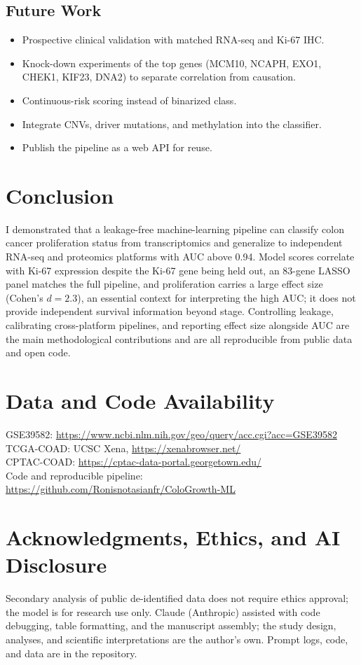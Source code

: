 \documentclass[12pt]{article}
\begin{document}
\subsection{Future Work}
\begin{itemize}
\item Prospective clinical validation with matched RNA-seq and Ki-67 IHC.
\item Knock-down experiments of the top genes (MCM10, NCAPH, EXO1, CHEK1, KIF23, DNA2) to separate correlation from causation.
\item Continuous-risk scoring instead of binarized class.
\item Integrate CNVs, driver mutations, and methylation into the classifier.
\item Publish the pipeline as a web API for reuse.
\end{itemize}

\section{Conclusion}

I demonstrated that a leakage-free machine-learning pipeline can classify colon cancer proliferation status from transcriptomics and generalize to independent RNA-seq and proteomics platforms with AUC above 0.94. Model scores correlate with Ki-67 expression despite the Ki-67 gene being held out, an 83-gene LASSO panel matches the full pipeline, and proliferation carries a large effect size (Cohen's $d = 2.3$), an essential context for interpreting the high AUC; it does not provide independent survival information beyond stage. Controlling leakage, calibrating cross-platform pipelines, and reporting effect size alongside AUC are the main methodological contributions and are all reproducible from public data and open code.

\newpage



\section*{Data and Code Availability}
GSE39582: \url{https://www.ncbi.nlm.nih.gov/geo/query/acc.cgi?acc=GSE39582}\\
TCGA-COAD: UCSC Xena, \url{https://xenabrowser.net/}\\
CPTAC-COAD: \url{https://cptac-data-portal.georgetown.edu/}\\
Code and reproducible pipeline: \url{https://github.com/Ronisnotasianfr/ColoGrowth-ML}

\section*{Acknowledgments, Ethics, and AI Disclosure}
Secondary analysis of public de-identified data does not require ethics approval; the model is for research use only. Claude (Anthropic) assisted with code debugging, table formatting, and the manuscript assembly; the study design, analyses, and scientific interpretations are the author's own. Prompt logs, code, and data are in the repository.
\end{document}
